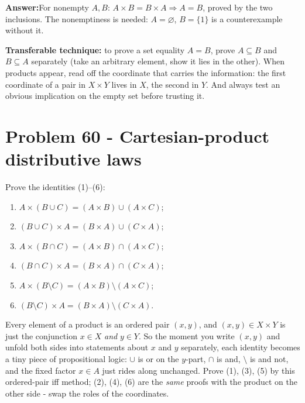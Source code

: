 \documentclass[11pt,a4paper]{article}
\newcommand{\answer}[1]{\begin{answerbox}\centering\textbf{Answer:}\quad #1\end{answerbox}}
\begin{document}
\answer{For nonempty $A,B$: $A\times B=B\times A\Rightarrow A=B$, proved by the two inclusions.
The nonemptiness is needed: $A=\varnothing$, $B=\{1\}$ is a counterexample without it.}

\begin{methodbox}
\textbf{Transferable technique:} to prove a set equality $A=B$, prove $A\subseteq B$ and
$B\subseteq A$ separately (\textquotedbl{}take an arbitrary element, show it lies in the
other\textquotedbl{}). When products appear, read off the coordinate that carries the information:
the first coordinate of a pair in $X\times Y$ lives in $X$, the second in $Y$. And always test an
\textquotedbl{}obvious\textquotedbl{} implication on the empty set before trusting it.
\end{methodbox}

\section*{Problem 60 - Cartesian-product distributive laws}

\begin{problembox}[60]
Prove the identities (1)--(6):
\begin{enumerate}[label=\textbf{(\arabic*)},leftmargin=1.4cm,itemsep=1pt]
\item $A\times(B\cup C)=(A\times B)\cup(A\times C)$;
\item $(B\cup C)\times A=(B\times A)\cup(C\times A)$;
\item $A\times(B\cap C)=(A\times B)\cap(A\times C)$;
\item $(B\cap C)\times A=(B\times A)\cap(C\times A)$;
\item $A\times(B\setminus C)=(A\times B)\setminus(A\times C)$;
\item $(B\setminus C)\times A=(B\times A)\setminus(C\times A)$.
\end{enumerate}
\end{problembox}

\begin{ideabox}
Every element of a product is an ordered pair $(x,y)$, and \textquotedbl{}$(x,y)\in
X\times Y$\textquotedbl{} is just the conjunction \textquotedbl{}$x\in X$ \emph{and} $y\in
Y$\textquotedbl{}. So the moment you write $(x,y)$ and unfold both sides into statements about
$x$ and $y$ separately, each identity becomes a tiny piece of propositional logic: $\cup$ is
\textquotedbl{}or\textquotedbl{} on the $y$-part, $\cap$ is \textquotedbl{}and\textquotedbl{},
$\setminus$ is \textquotedbl{}and not\textquotedbl{}, and the fixed factor $x\in A$ just rides
along unchanged. Prove (1), (3), (5) by this ordered-pair iff method; (2), (4), (6) are the
\emph{same} proofs with the product on the other side - swap the roles of the coordinates.
\end{ideabox}
\end{document}
